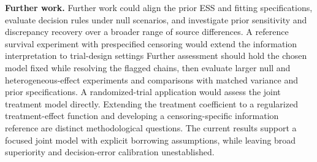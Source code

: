 \documentclass[11pt]{article}
\theoremstyle{remark}\newtheorem{remark}{Remark}[section]
\providecommand{\DIFaddtex}[1]{{\protect\color{blue} \sf #1}} %
\providecommand{\DIFdeltex}[1]{{\protect\color{red} \scriptsize #1}} %
\providecommand{\DIFaddbegin}{} %
\providecommand{\DIFaddend}{} %
\providecommand{\DIFdelbegin}{} %
\providecommand{\DIFdelend}{} %
\providecommand{\DIFadd}[1]{\texorpdfstring{\DIFaddtex{#1}}{#1}} %
\providecommand{\DIFdel}[1]{\texorpdfstring{\DIFdeltex{#1}}{}} %
\begin{document}
\DIFdelbegin %
\DIFdel{\textbf{Further work.}
Further work could align the prior ESS and fitting specifications, evaluate decision rules under null scenarios, and investigate prior sensitivity and discrepancy recovery over a broader range of source differences. A reference survival experiment with prespecified censoring would extend the information interpretation to trial-design settings}\DIFdelend \DIFaddbegin \DIFadd{Further assessment should hold the chosen model fixed while resolving the flagged chains, then evaluate larger null and heterogeneous-effect experiments and comparisons with matched variance and prior specifications. A randomized-trial application would assess the joint treatment model directly. Extending the treatment coefficient to a regularized treatment-effect function and developing a censoring-specific information reference are distinct methodological questions. The current results support a focused joint model with explicit borrowing assumptions, while leaving broad superiority and decision-error calibration unestablished}\DIFaddend .



\end{document}
